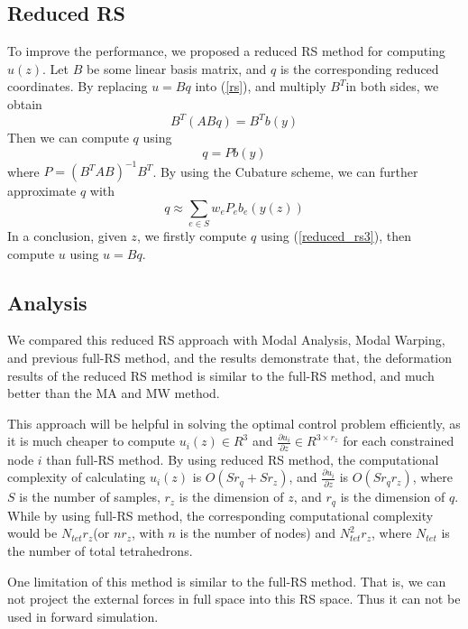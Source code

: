 \documentclass[9pt,twocolumn]{extarticle}
\begin{document}
\subsection{Reduced RS}\label{sec:reduc-rs-coord}
To improve the performance, we proposed a reduced RS method for computing
$u(z)$. Let $B$ be some linear basis matrix, and $q$ is the corresponding
reduced coordinates. By replacing $u = Bq$ into (\ref{rs}), and multiply $B^T$in
both sides, we obtain
\begin{equation} \label{reduced_rs1}
  B^T(ABq) = B^Tb(y)
\end{equation}
Then we can compute $q$ using
\begin{equation} \label{reduced_rs2}
  q = Pb(y)
\end{equation}
where $P = (B^TAB)^{-1}B^T$. By using the Cubature scheme, we can further
approximate $q$ with
\begin{equation} \label{reduced_rs3}
  q \approx \sum_{e\in{S}}w_eP_e{b_e(y(z))}
\end{equation}
In a conclusion, given $z$, we firstly compute $q$ using (\ref{reduced_rs3}),
then compute $u$ using $u=Bq$.

\subsection{Analysis}
We compared this reduced RS approach with Modal Analysis, Modal Warping, and
previous full-RS method, and the results demonstrate that, the deformation
results of the reduced RS method is similar to the full-RS method, and much
better than the MA and MW method.

This approach will be helpful in solving the optimal control problem
efficiently, as it is much cheaper to compute $u_i(z)\in R^3$ and
$\frac{\partial{u_i}}{\partial{z}}\in R^{3\times r_z}$ for each constrained node
$i$ than full-RS method. By using reduced RS method, the computational
complexity of calculating $u_i(z)$ is $O(Sr_q+Sr_z)$, and
$\frac{\partial{u_i}}{\partial{z}}$ is $O(Sr_qr_z)$, where $S$ is the number of
samples, $r_z$ is the dimension of $z$, and $r_q$ is the dimension of $q$. While
by using full-RS method, the corresponding computational complexity would be
$N_{tet}r_z$(or $nr_z$, with $n$ is the number of nodes) and $N^2_{tet}r_z$,
where $N_{tet}$ is the number of total tetrahedrons.

One limitation of this method is similar to the full-RS method. That is, we can
not project the external forces in full space into this RS space. Thus it can
not be used in forward simulation.
\end{document}

